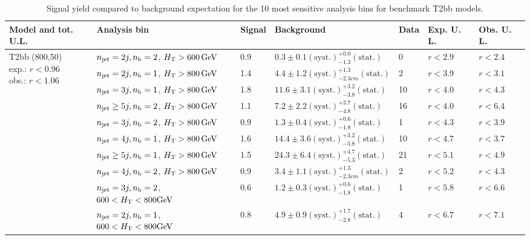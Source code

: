 \begin{table}[h!] 
  \scriptsize
  \caption{ 
Signal yield compared to background expectation for the 10 most sensitive analysis bins 
for benchmark T2bb models.
  \label{tab:sigBenchmarksYields_T2bb}}
  \centering 
  \begin{tabular}{ lllllll } 
    \hline 
    \hline 
    Model and tot. U.L. & Analysis bin & Signal & Background & Data & Exp. U. L. & Obs. U. L. \\ \hline
\multirow{10}{*}{\parbox[t]{2.3cm}{T2bb (800,50)\\exp.: $r<0.96$\\obs.: $r<1.06$}}
 & $n_{\mathrm{jet}} =2j,n_{\text{b}} =2$, $\mbox{$H_\text{T}$} > 600 \, \mathrm{GeV}$ & 0.9 & $0.3 \pm 0.1 \mathrm{(syst.)} ^{+0.0}_{-1.3} \mathrm{(stat.)}$ & 0 & $r < 2.9$ & $r < 2.4$\\ 
 & $n_{\mathrm{jet}} =2j,n_{\text{b}} =1$, $\mbox{$H_\text{T}$} > 800 \, \mathrm{GeV}$ & 1.4 & $4.4 \pm 1.2 \mathrm{(syst.)} ^{+1.3}_{-2.3cm} \mathrm{(stat.)}$ & 2 & $r < 3.9$ & $r < 3.1$\\ 
 & $n_{\mathrm{jet}} =3j,n_{\text{b}} =1$, $\mbox{$H_\text{T}$} > 800 \, \mathrm{GeV}$ & 1.8 & $11.6 \pm 3.1 \mathrm{(syst.)} ^{+3.2}_{-3.8} \mathrm{(stat.)}$ & 10 & $r < 4.0$ & $r < 4.3$\\ 
 & $n_{\mathrm{jet}} \geq5j,n_{\text{b}} =2$, $\mbox{$H_\text{T}$} > 800 \, \mathrm{GeV}$ & 1.1 & $7.2 \pm 2.2 \mathrm{(syst.)} ^{+3.7}_{-4.8} \mathrm{(stat.)}$ & 16 & $r < 4.0$ & $r < 6.4$\\ 
 & $n_{\mathrm{jet}} =3j,n_{\text{b}} =2$, $\mbox{$H_\text{T}$} > 800 \, \mathrm{GeV}$ & 0.9 & $1.3 \pm 0.4 \mathrm{(syst.)} ^{+0.6}_{-1.8} \mathrm{(stat.)}$ & 1 & $r < 4.3$ & $r < 3.9$\\ 
 & $n_{\mathrm{jet}} =4j,n_{\text{b}} =1$, $\mbox{$H_\text{T}$} > 800 \, \mathrm{GeV}$ & 1.6 & $14.4 \pm 3.6 \mathrm{(syst.)} ^{+3.2}_{-3.8} \mathrm{(stat.)}$ & 10 & $r < 4.7$ & $r < 3.7$\\ 
 & $n_{\mathrm{jet}} \geq5j,n_{\text{b}} =1$, $\mbox{$H_\text{T}$} > 800 \, \mathrm{GeV}$ & 1.5 & $24.3 \pm 6.4 \mathrm{(syst.)} ^{+4.7}_{-5.3} \mathrm{(stat.)}$ & 21 & $r < 5.1$ & $r < 4.9$\\ 
 & $n_{\mathrm{jet}} =4j,n_{\text{b}} =2$, $\mbox{$H_\text{T}$} > 800 \, \mathrm{GeV}$ & 0.9 & $3.4 \pm 1.1 \mathrm{(syst.)} ^{+1.3}_{-2.3cm} \mathrm{(stat.)}$ & 2 & $r < 5.2$ & $r < 4.3$\\ 
 & $n_{\mathrm{jet}} =3j,n_{\text{b}} =2$, $600 < \mbox{$H_\text{T}$} < 800 \mathrm{GeV}$ & 0.6 & $1.2 \pm 0.3 \mathrm{(syst.)} ^{+0.6}_{-1.8} \mathrm{(stat.)}$ & 1 & $r < 5.8$ & $r < 6.6$\\ 
 & $n_{\mathrm{jet}} =2j,n_{\text{b}} =1$, $600 < \mbox{$H_\text{T}$} < 800 \mathrm{GeV}$ & 0.8 & $4.9 \pm 0.9 \mathrm{(syst.)} ^{+1.7}_{-2.8} \mathrm{(stat.)}$ & 4 & $r < 6.7$ & $r < 7.1$\\ \hline

\end{tabular}
\end{table}
